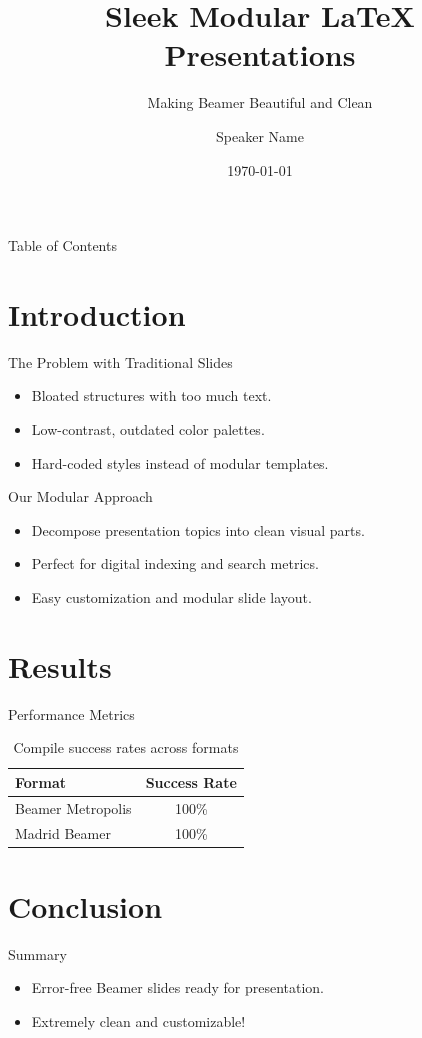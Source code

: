 \documentclass{beamer}
\title{Sleek Modular LaTeX Presentations}
\subtitle{Making Beamer Beautiful and Clean}
\date{\today}
\author{Speaker Name}
\institute{Academic Institution}
\begin{document}
\maketitle

\begin{frame}{Table of Contents}
  \tableofcontents
\end{frame}

\section{Introduction}

\begin{frame}{The Problem with Traditional Slides}
  \begin{itemize}
    \item Bloated structures with too much text.
    \item Low-contrast, outdated color palettes.
    \item Hard-coded styles instead of modular templates.
  \end{itemize}
\end{frame}

\begin{frame}{Our Modular Approach}
  \begin{itemize}
    \item Decompose presentation topics into clean visual parts.
    \item Perfect for digital indexing and search metrics.
    \item Easy customization and modular slide layout.
  \end{itemize}
\end{frame}

\section{Results}

\begin{frame}{Performance Metrics}
  \begin{table}
    \centering
    \caption{Compile success rates across formats}
    \begin{tabular}{lc}
      \toprule
      Format & Success Rate \\
      \midrule
      Beamer Metropolis & 100\% \\
      Madrid Beamer & 100\% \\
      \bottomrule
    \end{tabular}
  \end{table}
\end{frame}

\section{Conclusion}

\begin{frame}{Summary}
  \begin{itemize}
    \item Error-free Beamer slides ready for presentation.
    \item Extremely clean and customizable!
  \end{itemize}
\end{frame}
\end{document}

